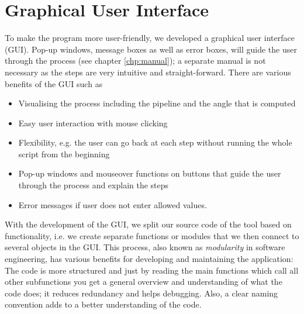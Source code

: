 
\section{Graphical User Interface}
To make the program more user-friendly, we developed a graphical user interface (GUI). Pop-up windows, message boxes as well as error boxes, will guide the user through the process (see chapter \ref{chp:manual}); a separate manual is not necessary as the steps are very intuitive and straight-forward.
There are various benefits of the GUI such as
\begin{itemize}
	\item Visualising the process including the pipeline and the angle that is computed
	\item Easy user interaction with mouse clicking
	\item Flexibility, e.g. the user can go back at each step without running the whole script from the beginning
	\item Pop-up windows and mouseover functions on buttons that guide the user through the process and explain the steps
	\item Error messages if user does not enter allowed values.
\end{itemize}

With the development of the GUI, we split our source code of the tool based on functionality, i.e. we create separate functions or modules that we then connect to several objects in the GUI. This process, also known as \textit{modularity} in software engineering, has various benefits for developing and maintaining the application: The code is %
more structured %
and just by reading the main functions which call all other subfunctions you get a general overview and understanding of what the code does; it reduces redundancy %
and helps debugging. Also, a clear naming convention adds to a better understanding of the code.



